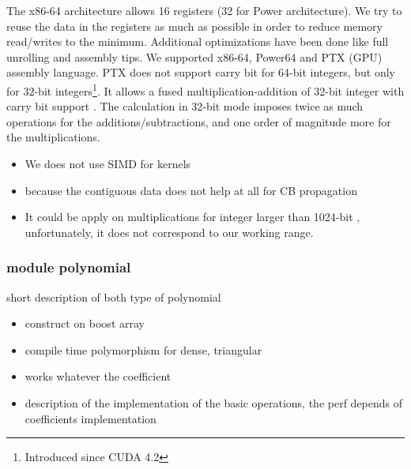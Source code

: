 \documentclass[oribibl]{llncs2e/llncs}
\begin{document}
The x86-64 architecture allows 16 registers (32 for Power architecture). We try to reuse the data in the registers as much as possible in order to reduce memory read/writes to the minimum.  Additional optimizations have been done like full unrolling and assembly tips. We  supported  x86-64, Power64 and PTX (GPU) assembly language. PTX does not support carry bit for 64-bit integers, but only for 32-bit integers\footnote{Introduced since CUDA 4.2}.  
It allows a fused multiplication-addition of 32-bit integer  with carry bit support \cite{CUDAasm}.  The calculation in 32-bit mode imposes twice as much operations for the additions/subtractions, and one order of magnitude more for the multiplications. 

\begin{itemize}
\item We does not use SIMD for kernels 
\item because the contiguous data does not help at all for CB propagation 
\item It could be  apply  on multiplications for integer  larger than 1024-bit \cite{SIMD}, unfortunately, it does not correspond to our working range. 


\end{itemize}

\subsubsection{module polynomial}

short description of both type of polynomial

\begin{itemize}
\item construct on boost array
\item compile time polymorphism for dense, triangular
\item works whatever the coefficient
\item description of the implementation of the basic operations, the perf depends of coefficients implementation
\end{itemize}
\end{document}
